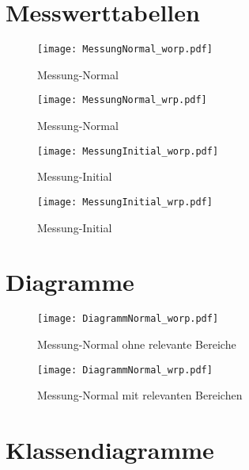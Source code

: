 \section{Messwerttabellen}

\label{sec:messtabellen}

\begin{figure}[H]
	\texttt{[image: MessungNormal\_worp.pdf]}
	\caption{Messung-Normal}	
	\label{fig:messung_normal_worp}
\end{figure}

\newpage

\begin{figure}[H]
	\texttt{[image: MessungNormal\_wrp.pdf]}
	\caption{Messung-Normal}
	\label{fig:messung_normal_wrp}	
\end{figure}

\newpage

\begin{figure}[H]
	\texttt{[image: MessungInitial\_worp.pdf]}
	\caption{Messung-Initial}	
\end{figure}

\newpage

\begin{figure}[H]
	\texttt{[image: MessungInitial\_wrp.pdf]}
	\caption{Messung-Initial}	
\end{figure}

\section{Diagramme}
\label{sec:Diagramme}

\begin{figure}[H]
	\centering
	\texttt{[image: DiagrammNormal\_worp.pdf]}
	\label{fig:diagrammNormal_worp}
	\caption{Messung-Normal ohne relevante Bereiche}
\end{figure}

\begin{figure}[H]
	\centering
	\texttt{[image: DiagrammNormal\_wrp.pdf]}
	\label{fig:diagrammNormal_wrp}
	\caption{Messung-Normal mit relevanten Bereichen}
\end{figure}

\section{Klassendiagramme}
\label{sec:klassendiagramme}

